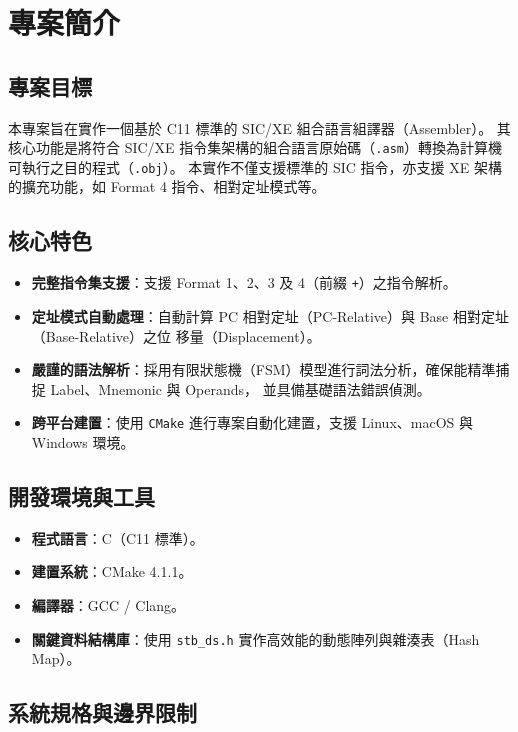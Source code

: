 \chapter{專案簡介}

\section{專案目標}

本專案旨在實作一個基於 C11 標準的 SIC/XE 組合語言組譯器（Assembler）。
其核心功能是將符合 SIC/XE 指令集架構的組合語言原始碼（\texttt{.asm}）轉換為計算機可執行之目的程式（\texttt{.obj}）。
本實作不僅支援標準的 SIC 指令，亦支援 XE 架構的擴充功能，如 Format 4 指令、相對定址模式等。

\section{核心特色}

\begin{itemize}
    \item \textbf{完整指令集支援}：支援 Format 1、2、3 及 4（前綴 \lstinline|+|）之指令解析。
    \item \textbf{定址模式自動處理}：自動計算 PC 相對定址（PC-Relative）與 Base 相對定址（Base-Relative）之位
          移量（Displacement）。
    \item \textbf{嚴謹的語法解析}：採用有限狀態機（FSM）模型進行詞法分析，確保能精準捕捉 Label、Mnemonic 與 Operands，
          並具備基礎語法錯誤偵測。
    \item \textbf{跨平台建置}：使用 \texttt{CMake} 進行專案自動化建置，支援 Linux、macOS 與 Windows 環境。
\end{itemize}

\section{開發環境與工具}

\begin{itemize}
    \item \textbf{程式語言}：C（C11 標準）。
    \item \textbf{建置系統}：CMake 4.1.1。
    \item \textbf{編譯器}：GCC / Clang。
    \item \textbf{關鍵資料結構庫}：使用 \texttt{stb\_ds.h} 實作高效能的動態陣列與雜湊表（Hash Map）。
\end{itemize}

\section{系統規格與邊界限制}

